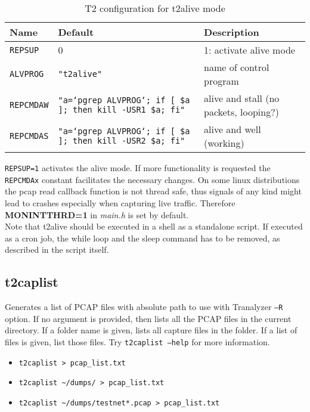 \documentclass[documentation]{subfiles}
\begin{document}
\begin{table}[!ht]
\centering
\small
\begin{tabular}{lll}
    \toprule
    {\bf Name} & {\bf Default} & {\bf Description}\\
    \midrule
    {\tt REPSUP}   & 0               & 1: activate alive mode\\
    {\tt ALVPROG}  & {\tt "t2alive"} & name of control program\\

    {\tt REPCMDAW} & {\tt "a=`pgrep ALVPROG`; if [ \$a ]; then kill -USR1 \$a; fi"} & alive and stall (no packets, looping?)\\
    {\tt REPCMDAS} & {\tt "a=`pgrep ALVPROG`; if [ \$a ]; then kill -USR2 \$a; fi"} & alive and well (working)\\
    \bottomrule
\end{tabular}
\caption{T2 configuration for t2alive mode}
\end{table}

{\tt REPSUP=1} activates the alive mode.
If more functionality is requested the {\tt REPCMDAx} constant facilitates the necessary changes.
On some linux distributions the pcap read callback function is not thread safe, thus signals of any kind might lead to crashes especially when capturing live traffic.
Therefore {\bf MONINTTHRD=1} in {\em main.h} is set by default. \\
Note that t2alive should be executed in a shell as a standalone script.
If executed as a cron job, the while loop and the sleep command has to be removed, as described in the script itself.

\subsection{t2caplist}\label{t2caplist}
Generates a list of PCAP files with absolute path to use with Tranalyzer {\tt --R} option.
If no argument is provided, then lists all the PCAP files in the current directory.
If a folder name is given, lists all capture files in the folder.
If a list of files is given, list those files.
Try {\tt t2caplist --help} for more information.
\begin{itemize}
    \item {\tt t2caplist > pcap\_list.txt}
    \item {\tt t2caplist \textasciitilde/dumps/ > pcap\_list.txt}
    \item {\tt t2caplist \textasciitilde/dumps/testnet*.pcap > pcap\_list.txt}
\end{itemize}
\end{document}
